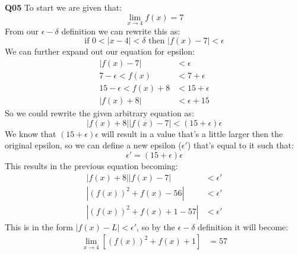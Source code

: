 \documentclass[11pt]{article}
\begin{document}
\parindent=0pt

\textbf{Q05} To start we are given that:
\[ \lim_{x \to 4} f(x) = 7 \]
From our $\epsilon-\delta$ definition we can rewrite this as:
\[ \text{if } 0 < |x - 4| < \delta \text{ then } |f(x) - 7| < \epsilon \]
We can further expand out our equation for epsilon:
\begin{align*}
|f(x) - 7|  & < \epsilon\\
7 - \epsilon <  f(x)  & < 7 + \epsilon\\
15 - \epsilon <  f(x) + 8  & < 15 + \epsilon\\
|f(x) + 8|  & < \epsilon + 15
\end{align*}
So we could rewrite the given arbitrary equation as:
\[ |f(x) + 8||f(x) - 7| < (15 + \epsilon)\epsilon \]
We know that $ (15 + \epsilon)\epsilon$ will result in a value that's a little larger then the original epsilon, so we can define a new epsilon ($\epsilon'$) that's equal to it such that:
\[ \epsilon' = (15 + \epsilon)\epsilon  \]
This results in the previous equation becoming:
\begin{align*}
|f(x) + 8||f(x) - 7| & <\epsilon' \\
|(f(x))^2 + f(x) - 56| & <\epsilon'  \\
|(f(x))^2 + f(x) + 1 - 57| & <\epsilon' 
\end{align*}
This is in the form $|f(x) -L| < \epsilon' $, so by the  $\epsilon-\delta$ definition it will become: 
\begin{align*}
 \lim_{x \to 4}[(f(x))^2 + f(x) + 1] & = 57
\end{align*}
\end{document}
